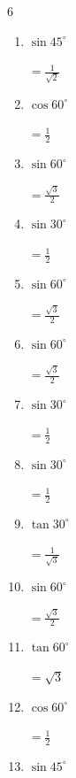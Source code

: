 \begin{multicols}{6}
\begin{enumerate}
        $\displaystyle =\frac{1}{\sqrt{3}}$

  \item $\displaystyle \sin{45^\circ}$

        $\displaystyle =\frac{1}{\sqrt{2}}$

  \item $\displaystyle \cos{60^\circ}$

        $\displaystyle =\frac{1}{2}$

  \item $\displaystyle \sin{60^\circ}$

        $\displaystyle =\frac{\sqrt{3}}{2}$

  \item $\displaystyle \sin{30^\circ}$

        $\displaystyle =\frac{1}{2}$

  \item $\displaystyle \sin{60^\circ}$

        $\displaystyle =\frac{\sqrt{3}}{2}$

  \item $\displaystyle \sin{60^\circ}$

        $\displaystyle =\frac{\sqrt{3}}{2}$

  \item $\displaystyle \sin{30^\circ}$

        $\displaystyle =\frac{1}{2}$

  \item $\displaystyle \sin{30^\circ}$

        $\displaystyle =\frac{1}{2}$

  \item $\displaystyle \tan{30^\circ}$

        $\displaystyle =\frac{1}{\sqrt{3}}$

  \item $\displaystyle \sin{60^\circ}$

        $\displaystyle =\frac{\sqrt{3}}{2}$

\columnbreak %

  \item $\displaystyle \tan{60^\circ}$

        $\displaystyle =\sqrt{3}$

  \item $\displaystyle \cos{60^\circ}$

        $\displaystyle =\frac{1}{2}$

  \item $\displaystyle \sin{45^\circ}$


\end{enumerate}
\end{multicols}
